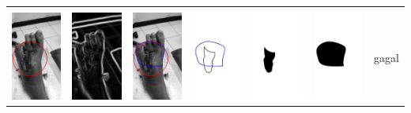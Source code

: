 \begin{table}[H]
\begin{tabular}{|m{0.7in}|m{0.7in}|m{0.7in}|m{0.7in}|m{0.7in}|m{0.7in}|m{0.7in}|}
		&  &  & & & &  \\
		\includegraphics[width=0.7in]{dataset/dataset_3/luka_merah/ready/2_interp_init.jpg}&
		\includegraphics[width=0.7in]{dataset/dataset_3/luka_merah/ready/2_interp_ext.jpg}&
		\includegraphics[width=0.7in]{dataset/dataset_3/luka_merah/ready/2_interp_result.jpg}&
		\includegraphics[width=0.7in]{dataset/dataset_3/luka_merah/ready/2_gt_r.jpg}&
		\includegraphics[width=0.7in]{dataset/dataset_3/luka_merah/ready/2_r.jpg}&
		\includegraphics[width=0.7in]{dataset/dataset_3/luka_merah/ready/2_interp_r.jpg}&
		gagal\\
		\hline
		
	\end{tabular}
\end{table}

